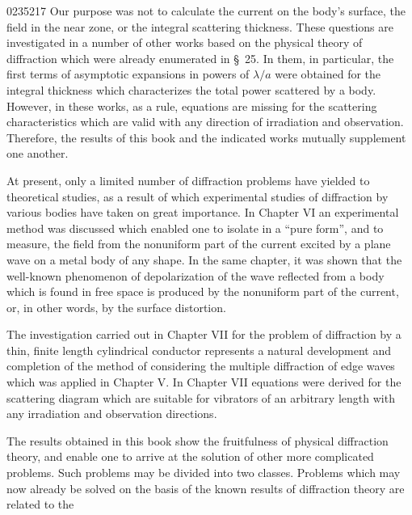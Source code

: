 \begin{scanpage}{0235}{217}
Our purpose was not to calculate the current on the body's surface, the field in the near zone, or the integral scattering thickness. These questions are investigated in a number of other works based on the physical theory of diffraction which were already enumerated in \S\ 25. In them, in particular, the first terms of asymptotic expansions in powers of $\lambda/a$ were obtained for the integral thickness which characterizes the total power scattered by a body. However, in these works, as a rule, equations are missing for the scattering characteristics which are valid with any direction of irradiation and observation. Therefore, the results of this book and the indicated works mutually supplement one another.

At present, only a limited number of diffraction problems have yielded to theoretical studies, as a result of which experimental studies of diffraction by various bodies have taken on great importance. In Chapter VI an experimental method was discussed which enabled one to isolate in a ``pure form'', and to measure, the field from the nonuniform part of the current excited by a plane wave on a metal body of any shape. In the same chapter, it was shown that the well-known phenomenon of depolarization of the wave reflected from a body which is found in free space is produced by the nonuniform part of the current, or, in other words, by the surface distortion.

The investigation carried out in Chapter VII for the problem of diffraction by a thin, finite length cylindrical conductor represents a natural development and completion of the method of considering the multiple diffraction of edge waves which was applied in Chapter V. In Chapter VII equations were derived for the scattering diagram which are suitable for vibrators of an arbitrary length with any irradiation and observation directions.

The results obtained in this book show the fruitfulness of physical diffraction theory, and enable one to arrive at the solution of other more complicated problems. Such problems may be divided into two classes. Problems which may now already be solved on the basis of the known results of diffraction theory are related to the
\end{scanpage}
